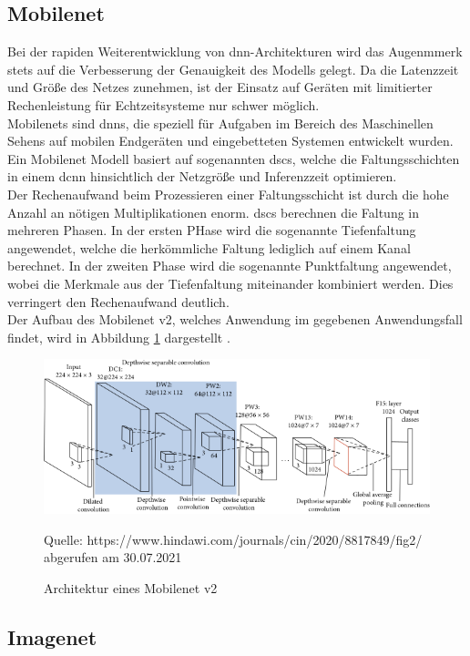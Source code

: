 \documentclass[oneside]{ausarbeitung}
\begin{document}
\subsection{Mobilenet}
Bei der rapiden Weiterentwicklung von \ac{dnn}-Architekturen wird das Augenmmerk stets auf die Verbesserung der Genauigkeit des Modells gelegt. Da die Latenzzeit und Größe des Netzes zunehmen, ist der Einsatz auf Geräten mit limitierter Rechenleistung für Echtzeitsysteme nur schwer möglich.\\
Mobilenets sind \acp{dnn}, die speziell für Aufgaben im Bereich des Maschinellen Sehens auf mobilen Endgeräten und eingebetteten Systemen entwickelt wurden. Ein Mobilenet Modell basiert auf sogenannten \acp{dsc}, welche die Faltungsschichten in einem \ac{dcnn} hinsichtlich der Netzgröße und Inferenzzeit optimieren. \\
Der Rechenaufwand beim Prozessieren einer Faltungsschicht ist durch die hohe Anzahl an nötigen Multiplikationen enorm. \acp{dsc} berechnen die Faltung in mehreren Phasen. In der ersten PHase wird die sogenannte Tiefenfaltung angewendet, welche die herkömmliche Faltung lediglich auf einem Kanal berechnet. In der zweiten Phase wird die sogenannte Punktfaltung angewendet, wobei die Merkmale aus der Tiefenfaltung miteinander kombiniert werden. Dies verringert den Rechenaufwand deutlich.\\
Der Aufbau des Mobilenet v2, welches Anwendung im gegebenen Anwendungsfall findet, wird in Abbildung \ref{fig:mobilenet-architecture} dargestellt \cite{mobilenet}.
\begin{figure}[hptb]
	\centering
	\includegraphics[height=0.27\textheight]{images/mobilenet-architecture.png}
	\caption{Architektur eines Mobilenet v2} Quelle: https://www.hindawi.com/journals/cin/2020/8817849/fig2/ abgerufen am 30.07.2021
	\label{fig:mobilenet-architecture}
\end{figure}

\subsection{Imagenet}
\end{document}
